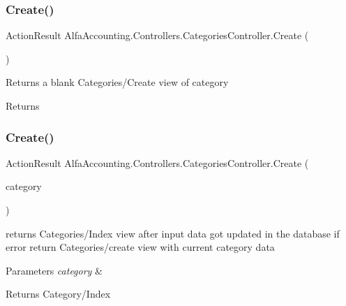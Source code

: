 \subsubsection{\texorpdfstring{Create()}{Create()}\hspace{0.1cm}{\footnotesize\ttfamily [1/2]}}
{\footnotesize\ttfamily Action\+Result Alfa\+Accounting.\+Controllers.\+Categories\+Controller.\+Create (\begin{DoxyParamCaption}{ }\end{DoxyParamCaption})}



Returns a blank Categories/\+Create view of category 

\begin{DoxyReturn}{Returns}

\end{DoxyReturn}
\mbox{\label{class_alfa_accounting_1_1_controllers_1_1_categories_controller_a7bb4f8825f6827ccf2acdb3a665e0960}} 
\subsubsection{\texorpdfstring{Create()}{Create()}\hspace{0.1cm}{\footnotesize\ttfamily [2/2]}}
{\footnotesize\ttfamily Action\+Result Alfa\+Accounting.\+Controllers.\+Categories\+Controller.\+Create (\begin{DoxyParamCaption}\item[{\mbox{[}\+Bind(\+Include = \char`\"{}\+Category\+Id,\+Category\+Name\char`\"{})\mbox{]} Category}]{category }\end{DoxyParamCaption})}



returns Categories/\+Index view after input data got updated in the database if error return Categories/create view with current category data 


\begin{DoxyParams}{Parameters}
{\em category} & \\
\hline
\end{DoxyParams}
\begin{DoxyReturn}{Returns}
Category/\+Index 
\end{DoxyReturn}
\mbox{\label{class_alfa_accounting_1_1_controllers_1_1_categories_controller_a4b6eab9f8217e12a9355096d8428ecce}} 
